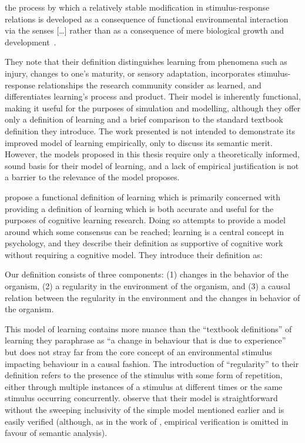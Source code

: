 \begin{displayquote}
\textelp{} the process by which a relatively stable modification in
stimulus-response relations is developed as a consequence of functional
environmental interaction via the senses [\ldots{}] rather than as a consequence
of mere biological growth and development~\cite{lachman1997learning}.
\end{displayquote}

They note that their definition distinguishes learning from phenomena such as
injury, changes to one's maturity, or sensory adaptation, incorporates
stimulus-response relationships the research community consider as learned, and
differentiates learning's process and product. Their model is inherently
functional, making it useful for the purposes of simulation and modelling,
although they offer only a definition of learning and a brief comparison to
the standard textbook definition they introduce. The work presented is not
intended to demonstrate its improved model of learning empirically, only to
discuss its semantic merit. However, the models proposed in this thesis require
only a theoretically informed, sound basis for their model of learning, and a
lack of empirical justification is not a barrier to the relevance of the model
\citeauthor{lachman1997learning} proposes.

\citet{de2013learning} propose a functional definition of learning which is
primarily concerned with providing a definition of learning which is both
accurate and useful for the purposes of cognitive learning research. Doing so
attempts to provide a model around which some consensus can be reached; learning
is a central concept in psychology, and they describe their definition as
supportive of cognitive work without requiring a cognitive model. They introduce
their definition as:

\begin{displayquote}
Our definition consists of three components: (1) changes in the behavior of the
organism, (2) a regularity in the environment of the organism, and (3) a causal
relation between the regularity in the environment and the changes in behavior
of the organism.
\end{displayquote}

This model of learning contains more nuance than the ``textbook definitions'' of
learning they paraphrase as ``a change in behaviour that is due to experience''
but does not stray far from the core concept of an environmental stimulus
impacting behaviour in a causal fashion. The introduction of ``regularity'' to
their definition refers to the presence of the stimulus with some form of
repetition, either through multiple instances of a stimulus at different times
or the same stimulus occurring concurrently. \citet{de2013learning} observe that
their model is straightforward without the sweeping inclusivity of the simple
model mentioned earlier and is easily verified (although, as in the work of
\citet{lachman1997learning}, empirical verification is omitted in favour of
semantic analysis).

